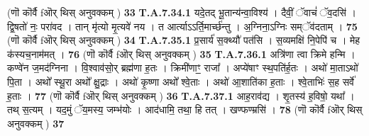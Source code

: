 \documentclass[17pt]{extarticle}
\begin{document}
{                  \newline
                                                        (णॊ कॊर्वै fऒर् थिस् अनुवक्कम् ) \textbf{33} \newline \newline
                                \textbf{ T.A.7.34.1} \newline
                  यदे॒तद् भू॒तान्य॑न्वा॒विश्य॑ । दैवीं॒ ॅवाचं॑ ॅव॒दसि॑ । द्वि॒षतो॑ नः॒ परा॑वद । तान् मृ॑त्यो मृ॒त्यवे॑ नय । त आर्त्याऽऽर्ति॒मार्च्छ॑न्तु ।  अ॒ग्निना॒ऽग्निः सम्ॅव॑दताम् । \textbf{ 75} \newline
                  \newline
                                                        (णॊ कॊर्वै fऒर् थिस् अनुवक्कम् ) \textbf{34} \newline \newline
                                \textbf{ T.A.7.35.1} \newline
                  प्र॒सार्य॑ स॒क्थ्यौ॑ पत॑सि । स॒व्यमक्षि॑ नि॒पेपि॑ च ।  मेह क॑स्यच॒नाम॑मत् । \textbf{ 76} \newline
                  \newline
                                                        (णॊ कॊर्वै fऒर् थिस् अनुवक्कम् ) \textbf{35} \newline \newline
                                \textbf{ T.A.7.36.1} \newline
                  अत्रि॑णा त्वा क्रिमे हन्मि । कण्वे॑न ज॒मद॑ग्निना ।  वि॒श्वाव॑सो॒र् ब्रह्म॑णा ह॒तः । क्रिमी॑णाꣳ॒॒ राजा᳚ ।  अप्ये॑षाꣳ स्थ॒पति॑र्ह॒तः । अथो॑ मा॒ताऽथो॑ पि॒ता ।  अथो᳚ स्थू॒रा अथो᳚ क्षु॒द्राः । अथो॑ कृ॒ष्णा अथो᳚ श्वे॒ताः । अथो॑ आ॒शाति॑का ह॒ताः ।  श्वे॒ताभिः॑ स॒ह सर्वे॑ ह॒ताः । \textbf{ 77} \newline
                  \newline
                                                        (णॊ कॊर्वै fऒर् थिस् अनुवक्कम् ) \textbf{36} \newline \newline
                                \textbf{ T.A.7.37.1} \newline
                  आह॒राव॑द्य । शृ॒तस्य॑ ह॒विषो॒ यथा᳚ । तथ् स॒त्यम् ।  यद॒मुं ॅय॒मस्य॒ जम्भ॑योः । आद॑धामि॒ तथा॒ हि तत् । खण्फण्म्रसि॑ । \textbf{ 78} \newline
                  \newline
                                                        (णॊ कॊर्वै fऒर् थिस् अनुवक्कम् ) \textbf{37} \newline \newline
}
\end{document}

